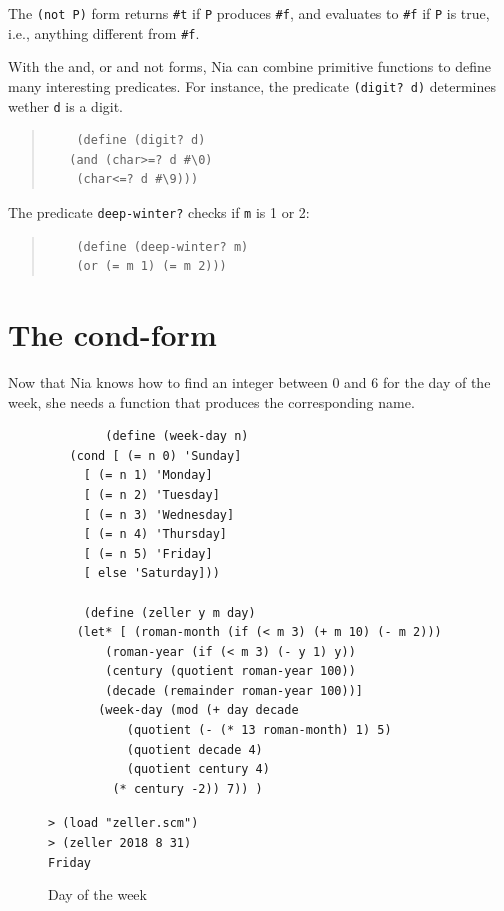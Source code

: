 \documentclass[a4paper,12pt]{book}
\newenvironment{fmpage}[1]
{\begin{lrbox}{\fmbox}\begin{minipage}{#1}}
{\end{minipage}\end{lrbox}\fbox{\usebox{\fmbox}}}
\begin{document}
The \verb|(not P)| form returns \verb|#t|
if \verb|P| produces \verb|#f|, and
evaluates to \verb|#f| if \verb|P| is true,
i.e., anything different from \verb|#f|.

With the and, or and not forms, Nia can
combine primitive functions to define
many interesting predicates. For instance,
the predicate \verb|(digit? d)| determines
wether \verb|d| is a digit.
\begin{quote}
	\begin{verbatim}
	(define (digit? d)
   (and (char>=? d #\0)
	(char<=? d #\9)))
	\end{verbatim}
\end{quote}
The predicate \verb|deep-winter?| checks if
\verb|m| is 1 or 2:
\begin{quote}
	\begin{verbatim}
	(define (deep-winter? m)
    (or (= m 1) (= m 2)))
	\end{verbatim}
\end{quote}


\section{The cond-form}\label{page:cond-form}
Now that Nia knows how to find
an integer between 0 and 6 for the 
day of the week, she needs a function
that produces the corresponding name.


\begin{figure}[!h]
	\begin{fmpage}{\linewidth}
		\begin{verbatim}
		(define (week-day n)
   (cond [ (= n 0) 'Sunday]
	 [ (= n 1) 'Monday]
	 [ (= n 2) 'Tuesday]
	 [ (= n 3) 'Wednesday]
	 [ (= n 4) 'Thursday]
	 [ (= n 5) 'Friday]
	 [ else 'Saturday]))

	 (define (zeller y m day)
    (let* [ (roman-month (if (< m 3) (+ m 10) (- m 2)))
	    (roman-year (if (< m 3) (- y 1) y))
	    (century (quotient roman-year 100))
	    (decade (remainder roman-year 100))]
       (week-day (mod (+ day decade
		   (quotient (- (* 13 roman-month) 1) 5)
		   (quotient decade 4)
		   (quotient century 4)
	     (* century -2)) 7)) )

		\end{verbatim}
	\end{fmpage}

	\begin{fmpage}{\linewidth}
		\verb|> (load "zeller.scm")|\\
		\verb|> (zeller 2018 8 31)|\\
		\verb|Friday|
	\end{fmpage}
	\caption{Day of the week}
	\label{fig:day-of-the-week}
\end{figure}
\end{document}
